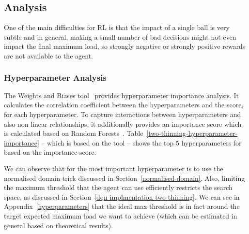 \subsection{\DQL Analysis} \label{dql-analysis-two-thinning}

One of the main difficulties for RL is that the impact of a single ball is very subtle and in general, making a small number of bad decisions might not even impact the final maximum load, so strongly negative or strongly positive rewards are not available to the agent.

\subsubsection*{Hyperparameter Analysis}


The Weights and Biases tool~\cite{biewald2020wandb} provides hyperparameter importance analysis. It calculates the correlation coefficient between the hyperparameters and the score, for each hyperparameter. To capture interactions between hyperparameters and also non-linear relationships, it additionally provides an importance score which is calculated based on Random Forests~\cite{biewald2020wandb}. Table~\ref{two-thinning-hyperparameter-importance} -- which is based on the tool -- shows the top $5$ hyperparameters for \TwoThinning based on the importance score.


We can observe that for \TwoThinning the most important hyperparameter is to use the normalised domain trick discussed in Section~\ref{normalised-domain}. Also, limiting the maximum threshold that the agent can use efficiently restricts the search space, as discussed in Section~\ref{dqn-implmentation-two-thinning}. We can see in Appendix~\ref{hyperparameters} that the ideal max threshold is in fact around the target expected maximum load we want to achieve (which can be estimated in general based on theoretical results).



\newcommand{\Progress}[2]{
\begin{tikzpicture}
\draw[fill=#2!10!white] (0,0) rectangle (5, 0.3);
\draw[fill=#2!50!white] (0,0) rectangle (5 * #1, 0.3);
\end{tikzpicture}
}


